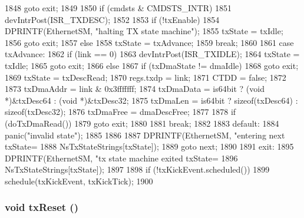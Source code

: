 \begin{DoxyCode}
{{1848             goto exit;
1849 
1850         if (cmdsts & CMDSTS_INTR)
1851             devIntrPost(ISR_TXDESC);
1852 
1853         if (!txEnable) {
1854             DPRINTF(EthernetSM, "halting TX state machine\n");
1855             txState = txIdle;
1856             goto exit;
1857         } else
1858             txState = txAdvance;
1859         break;
1860 
1861       case txAdvance:
1862         if (link == 0) {
1863             devIntrPost(ISR_TXIDLE);
1864             txState = txIdle;
1865             goto exit;
1866         } else {
1867             if (txDmaState != dmaIdle)
1868                 goto exit;
1869             txState = txDescRead;
1870             regs.txdp = link;
1871             CTDD = false;
1872 
1873             txDmaAddr = link & 0x3fffffff;
1874             txDmaData = is64bit ? (void *)&txDesc64 : (void *)&txDesc32;
1875             txDmaLen = is64bit ? sizeof(txDesc64) : sizeof(txDesc32);
1876             txDmaFree = dmaDescFree;
1877 
1878             if (doTxDmaRead())
1879                 goto exit;
1880         }
1881         break;
1882 
1883       default:
1884         panic("invalid state");
1885     }
1886 
1887     DPRINTF(EthernetSM, "entering next txState=%
1888             NsTxStateStrings[txState]);
1889     goto next;
1890 
1891   exit:
1895     DPRINTF(EthernetSM, "tx state machine exited txState=%
1896             NsTxStateStrings[txState]);
1897 
1898     if (!txKickEvent.scheduled())
1899         schedule(txKickEvent, txKickTick);
1900 }
\end{DoxyCode}
\hypertarget{classNSGigE_a447fd38bd74f85433761a6a2b73454e2}{
\subsubsection[{txReset}]{\setlength{\rightskip}{0pt plus 5cm}void txReset ()}}
\label{classNSGigE_a447fd38bd74f85433761a6a2b73454e2}



